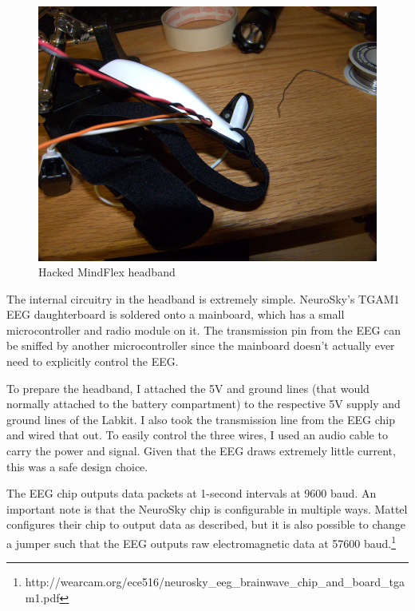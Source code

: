 \documentclass[letterpaper,10pt,notitlepage]{report}
\begin{document}
        \begin{figure}[h!]
        \begin{center}
            \includegraphics[scale=.4]{fig/mindflex.png}
            \caption{Hacked MindFlex headband}
            \label{fig:mindflex}
        \end{center}
        \end{figure}

        The internal circuitry in the headband is extremely simple.  NeuroSky's
        TGAM1 EEG daughterboard is soldered onto a mainboard, which has a small
        microcontroller and radio module on it.  The transmission pin from the
        EEG can be sniffed by another microcontroller since the mainboard
        doesn't actually ever need to explicitly control the EEG.

        To prepare the headband, I attached the 5V and ground lines (that would
        normally attached to the battery compartment) to the respective 5V
        supply and ground lines of the Labkit.  I also took the transmission
        line from the EEG chip and wired that out.  To easily control the
        three wires, I used an audio cable to carry the power and signal.
        Given that the EEG draws extremely little current, this was a safe
        design choice.

        The EEG chip outputs data packets at 1-second intervals at 9600 baud.
        An important note is that the NeuroSky chip is configurable in multiple
        ways.  Mattel configures their chip to output data as described, but it
        is also possible to change a jumper such that the EEG outputs raw
        electromagnetic data at 57600
        baud.\footnote{http://wearcam.org/ece516/neurosky\_eeg\_brainwave\_chip\_and\_board\_tgam1.pdf}
\end{document}
